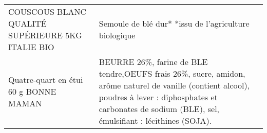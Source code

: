 \begin{longtable}{p{5cm}p{10cm}}
                                                       COUSCOUS BLANC QUALITÉ SUPÉRIEURE 5KG  ITALIE  BIO &                                                                                                                                                                                                                                                                                                                                                                                                                                                                                                                                                                                                                                                                                                                                                                                                                                                                                                                                                                                   Semoule de blé dur*  *issu de l'agriculture biologique \\
                                                                    Quatre-quart en étui 60 g BONNE MAMAN &                                                                                                                                                                                                                                                                                                                                                                                                                                                                                                                                                                                                                                                                                                                                                                                                                         BEURRE 26\%, farine de BLE tendre,OEUFS frais 26\%, sucre, amidon, arôme naturel de vanille (contient alcool), poudres à lever : diphosphates et carbonates de sodium (BLE), sel, émulsifiant : lécithines (SOJA). \\

\end{longtable}
